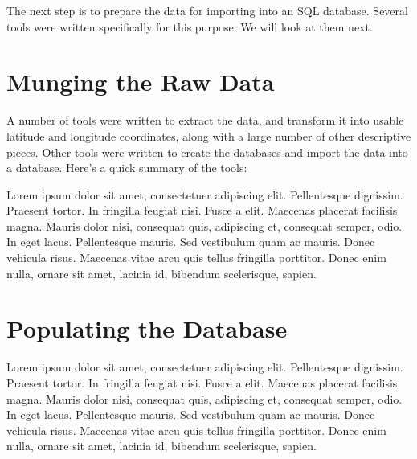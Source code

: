 \documentclass[11pt,letterpaper,onecolumn,twoside,openright,final]{report}
\begin{document}
The next step is to prepare the data for importing into an SQL database.
Several tools were written specifically for this purpose.
We will look at them next.

\section{Munging the Raw Data}

A number of tools were written to extract the data, and transform it into usable latitude and longitude coordinates, along with a large number of other descriptive pieces.
Other tools were written to create the databases and import the data into a database.
Here's a quick summary of the tools:

Lorem ipsum dolor sit amet, consectetuer adipiscing elit.
Pellentesque dignissim.
Praesent tortor.
In fringilla feugiat nisi.
Fusce a elit.
Maecenas placerat facilisis magna.
Mauris dolor nisi, consequat quis, adipiscing et, consequat semper, odio.
In eget lacus.
Pellentesque mauris.
Sed vestibulum quam ac mauris.
Donec vehicula risus.
Maecenas vitae arcu quis tellus fringilla porttitor.
Donec enim nulla, ornare sit amet, lacinia id, bibendum scelerisque, sapien.

\section{Populating the Database}

Lorem ipsum dolor sit amet, consectetuer adipiscing elit.
Pellentesque dignissim.
Praesent tortor.
In fringilla feugiat nisi.
Fusce a elit.
Maecenas placerat facilisis magna.
Mauris dolor nisi, consequat quis, adipiscing et, consequat semper, odio.
In eget lacus.
Pellentesque mauris.
Sed vestibulum quam ac mauris.
Donec vehicula risus.
Maecenas vitae arcu quis tellus fringilla porttitor.
Donec enim nulla, ornare sit amet, lacinia id, bibendum scelerisque, sapien.
\end{document}
